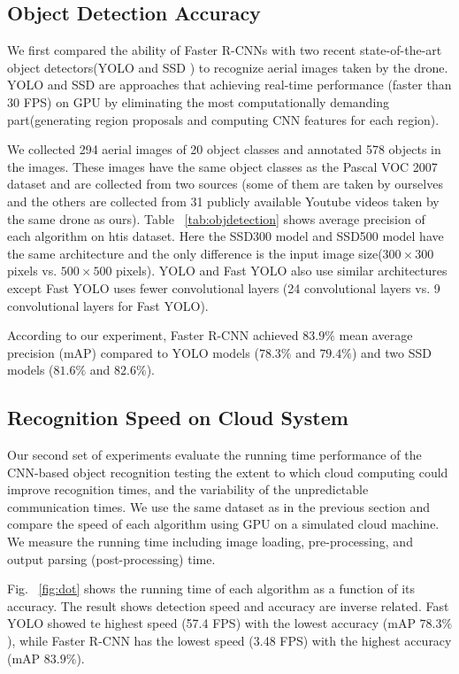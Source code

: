 \subsection{Object Detection Accuracy}
We first compared the ability of Faster R-CNNs with two recent state-of-the-art object detectors(YOLO
 and SSD
) to recognize aerial images taken by the drone.
YOLO and SSD are approaches that achieving real-time performance (faster than 30 FPS) on GPU by eliminating the most computationally demanding part(generating region proposals and computing CNN features for each region). 

We collected 294 aerial images of 20 object classes and annotated 578 objects in the images. 
These images have the same object classes as the Pascal VOC 2007 dataset and are collected from two sources (some of them are taken by ourselves and the others are collected from 31 publicly available Youtube videos taken by the same drone as ours).
Table ~\ref{tab:objdetection} shows average precision of each algorithm on htis dataset. Here the SSD300 model and SSD500 model have the same architecture and the only difference is the input image size($300 \times 300$ pixels vs. $500 \times 500$ pixels). YOLO and Fast YOLO also use similar architectures except Fast YOLO uses fewer convolutional layers (24 convolutional layers vs. 9 convolutional layers for Fast YOLO).

According to our experiment, Faster R-CNN achieved $83.9\%$ mean average precision (mAP) compared to YOLO models ($78.3\%$ and $79.4\%$) and two SSD models ($81.6\%$ and $82.6\%$).

\subsection{Recognition Speed on Cloud System}
Our second set of experiments evaluate the running time performance of the CNN-based object recognition testing the extent to which cloud computing could improve recognition times, and the variability of the unpredictable communication times. We use the same dataset as in the previous section and compare the speed of each algorithm using GPU on a simulated cloud machine.
We measure the running time including image loading, pre-processing, and output parsing (post-processing) time.

Fig. ~\ref{fig:dot} shows the running time of each algorithm as a function of its accuracy. 
The result shows detection speed and accuracy are inverse related. Fast YOLO showed te highest speed (57.4 FPS) with the lowest accuracy (mAP $78.3\%$), while Faster R-CNN has the lowest speed (3.48 FPS) with the highest accuracy (mAP $83.9\%$).

